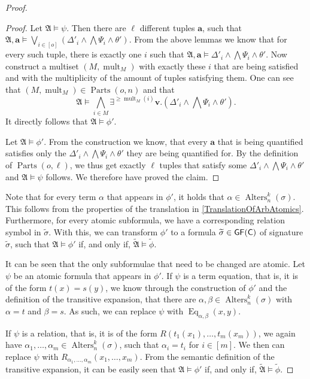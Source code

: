 \begin{proof}
\begin{proof}
		Let $\mathfrak A\models \psi$.
		Then there are $\ell$ different tuples $\mathbf a$, such that $\mathfrak A,\mathbf a \models \bigvee_{i\in[o]}(\Delta'_i\land\bigwedge\Psi_i\land\theta')$.
		From the above lemmas we know that for every such tuple, there is exactly one $i$ such that $\mathfrak A,\mathbf a\models \Delta'_i\land\bigwedge \Psi_i\land \theta'$.
		Now construct a multiset $(M,\operatorname{mult}_M)$ with exactly these $i$ that are being satisfied and with the multiplicity of the amount of tuples satisfying them.
		One can see that $(M,\operatorname{mult}_M)\in \operatorname{Parts}(o,n)$ and that 
		$$\mathfrak A \models \bigwedge_{i\in M}\exists^{\geq\operatorname{mult}_M(i)}\mathbf v. (\Delta'_i\land \bigwedge\Psi_i\land \theta').$$
		It directly follows that $\mathfrak A\models \phi'$.
		
		Let $\mathfrak A\models \phi'$.
		From the construction we know, that every $\mathbf a$ that is being quantified satisfies only the $\Delta'_i\land\bigwedge\Psi_i\land\theta'$ they are being quantified for.
		By the definition of $\operatorname{Parts}(o,\ell)$, we thus get exactly $\ell$ tuples that satisfy some $\Delta'_i\land\bigwedge\Psi_i\land\theta'$ and $\mathfrak A\models \psi$ follows.
		We therefore have proved the claim.
	\end{proof}
	
	Note that for every term $\alpha$ that appears in $\phi'$, it holds that $\alpha\in \operatorname{Alters}^k_n(\sigma)$.
	This follows from the properties of the translation in \cref{TranslationOfArbAtomics}.
	Furthermore, for every atomic subformula, we have a corresponding relation symbol in $\widetilde{\sigma}$.
	With this, we can transform $\phi'$ to a formula $\widetilde{\sigma}\in\mathsf{GF}(\mathsf{C})$ of signature $\widetilde{\sigma}$, such that $\mathfrak A\models \phi'$ if, and only if, $\widetilde{\mathfrak A}\models \widetilde{\phi}$.
	
	It can be seen that the only subformulae that need to be changed are atomic.
	Let $\psi$ be an atomic formula that appears in $\phi'$.
	If $\psi$ is a term equation, that is, it is of the form $t(x)=s(y)$, we know through the construction of $\phi'$ and the definition of the transitive expansion, that there are $\alpha,\beta\in \operatorname{Alters}^k_n(\sigma)$ with $\alpha=t$ and $\beta=s$. 
	As such, we can replace $\psi$ with $\operatorname{Eq}_{\alpha,\beta}(x,y)$.
	
	If $\psi$ is a relation, that is, it is of the form $R(t_1(x_1),\dots,t_m(x_m))$, we again have $\alpha_1,\dots,\alpha_m\in \operatorname{Alters}^k_n(\sigma)$, such that $\alpha_i=t_i$ for $i\in[m]$.
	We then can replace $\psi$ with $R_{\alpha_1,\dots,\alpha_m}(x_1,\dots,x_m)$.
	From the semantic definition of the transitive expansion, it can be easily seen that $\mathfrak A\models \phi'$ if, and only if, $\widetilde{\mathfrak A}\models \widetilde{\phi}$.
	

\end{proof}
